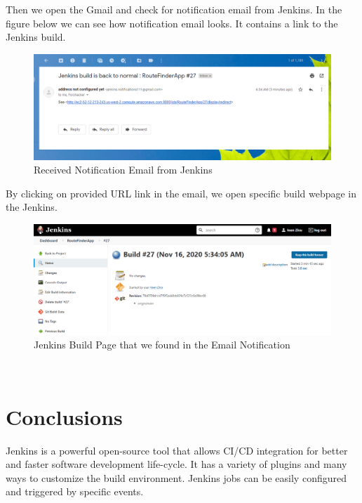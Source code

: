 \documentclass[12pt,a4paper,twoside]{article}
\begin{document}
Then we open the Gmail and check for notification email from Jenkins. 
In the figure below we can see how notification email looks. It contains a link to the Jenkins build.


\begin{figure}[H]
    \centering
        \includegraphics[width=15cm]{images-aws/58-gmail-notification-received-full.png}
        \caption{Received Notification Email from Jenkins}
\end{figure}


By clicking on provided URL link in the email, we open specific build webpage in the Jenkins.


\begin{figure}[H]
    \centering
        \includegraphics[width=15cm]{images-aws/59-gmail-notification-link-open.png}
        \caption{Jenkins Build Page that we found in the Email Notification}
\end{figure}






~\newpage


\section{Conclusions}

Jenkins is a powerful open-source tool that allows CI/CD integration for better and faster software development life-cycle. It has a variety of plugins and many ways to customize the build environment. Jenkins jobs can be easily configured and triggered by specific events. 
\end{document}
